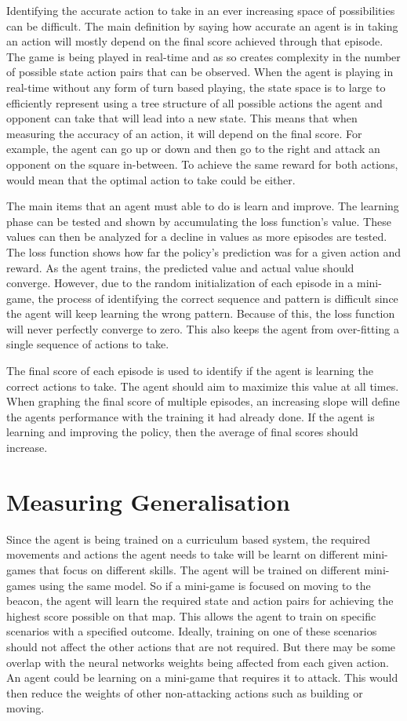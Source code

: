 Identifying the accurate action to take in an ever increasing space of possibilities can be difficult. The main definition by saying how accurate an agent is in taking an action will mostly depend on the final score achieved through that episode. The game is being played in real-time and as so creates complexity in the number of possible state action pairs that can be observed. When the agent is playing in real-time without any form of turn based playing, the state space is to large to efficiently represent using a tree structure of all possible actions the agent and opponent can take that will lead into a new state. This means that when measuring the accuracy of an action, it will depend on the final score. For example, the agent can go up or down and then go to the right and attack an opponent on the square in-between. To achieve the same reward for both actions, would mean that the optimal action to take could be either. 

The main items that an agent must able to do is learn and improve. The learning phase can be tested and shown by accumulating the loss function's value. These values can then be analyzed for a decline in values as more episodes are tested. The loss function shows how far the policy's prediction was for a given action and reward. As the agent trains, the predicted value and actual value should converge. However, due to the random initialization of each episode in a mini-game, the process of identifying the correct sequence and pattern is difficult since the agent will keep learning the wrong pattern. Because of this, the loss function will never perfectly converge to zero. This also keeps the agent from over-fitting a single sequence of actions to take.

The final score of each episode is used to identify if the agent is learning the correct actions to take. The agent should aim to maximize this value at all times. When graphing the final score of multiple episodes, an increasing slope will define the agents performance with the training it had already done. If the agent is learning and improving the policy, then the average of final scores should increase.


\section{Measuring Generalisation}

Since the agent is being trained on a curriculum based system, the required movements and actions the agent needs to take will be learnt on different mini-games that focus on different skills. The agent will be trained on different mini-games using the same model. So if a mini-game is focused on moving to the beacon, the agent will learn the required state and action pairs for achieving the highest score possible on that map. This allows the agent to train on specific scenarios with a specified outcome. Ideally, training on one of these scenarios should not affect the other actions that are not required. But there may be some overlap with the neural networks weights being affected from each given action. An agent could be learning on a mini-game that requires it to attack. This would then reduce the weights of other non-attacking actions such as building or moving. 


